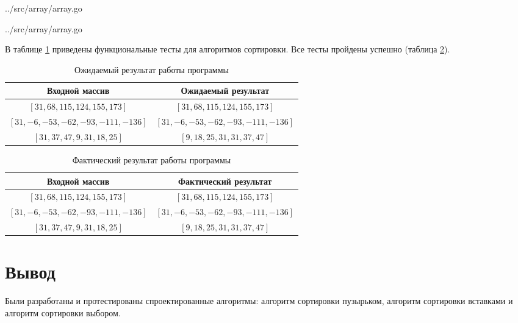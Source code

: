 \begin{lstinputlisting}[
	caption={Алгоритм сортировки выбором},
	label={lst:selection},
	style={go},
	linerange={51-63},
	]{../src/array/array.go}
\end{lstinputlisting}

\begin{lstinputlisting}[
	caption={Алгоритм сортировки вставками},
	label={lst:insertion},
	style={go},
	linerange={40-49},
	]{../src/array/array.go}
\end{lstinputlisting}

\clearpage



В таблице \ref{tabular:func_test} приведены функциональные тесты для алгоритмов сортировки. Все тесты пройдены успешно (таблица \ref{tabular:func_test_res}).


\begin{table}[h!]
	\begin{center}
		\caption{\label{tabular:func_test}Ожидаемый результат работы программы}
		\begin{tabular}{|c|c|}
			\hline
			Входной массив & Ожидаемый результат \\ 
			\hline
			$[31, 68, 115, 124, 155, 173]$ & $[31, 68, 115, 124, 155, 173]$ \\\hline
			$[31, -6, -53, -62, -93, -111, -136]$ & $[31, -6, -53, -62, -93, -111, -136]$ \\\hline
			$[31, 37, 47, 9, 31, 18, 25]$ & $[9, 18, 25, 31, 31, 37, 47]$ \\\hline
		\end{tabular}
	\end{center}
\end{table}

\begin{table}[h!]
	\begin{center}
		\caption{\label{tabular:func_test_res}Фактический результат работы программы}
		\begin{tabular}{|c|c|}
			\hline
			Входной массив & Фактический результат \\ 
			\hline
			$[31, 68, 115, 124, 155, 173]$ & $[31, 68, 115, 124, 155, 173]$ \\\hline
			$[31, -6, -53, -62, -93, -111, -136]$ & $[31, -6, -53, -62, -93, -111, -136]$ \\\hline
			$[31, 37, 47, 9, 31, 18, 25]$ & $[9, 18, 25, 31, 31, 37, 47]$ \\\hline
		\end{tabular}
	\end{center}
\end{table}


\captionsetup{singlelinecheck = false, justification=centering}

\section{Вывод}

Были разработаны и протестированы спроектированные алгоритмы: алгоритм сортировки пузырьком, алгоритм сортировки вставками и алгоритм сортировки выбором.
